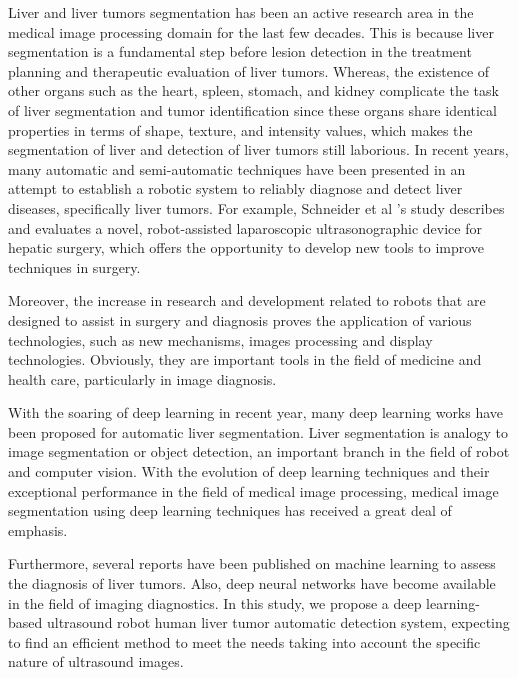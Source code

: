 \documentclass [11pt, twocolumn] {article}
\begin{document}
Liver and liver tumors segmentation has been an active research area in the medical image processing domain for the last few decades. This is because liver segmentation is a fundamental step before lesion detection in the treatment planning and therapeutic evaluation of liver tumors\cite{r3}. Whereas, the existence of other organs such as the heart, spleen, stomach, and kidney complicate the task of liver segmentation and tumor identification since these organs share identical properties in terms of shape, texture, and intensity values, which makes the segmentation of liver and detection of liver tumors still laborious\cite{r4}. In recent years, many automatic and semi-automatic techniques have been presented in an attempt to establish a robotic system to reliably diagnose and detect liver diseases, specifically liver tumors. For example, Schneider et al\cite{r5} 's study describes and evaluates a novel, robot-assisted laparoscopic ultrasonographic device for hepatic surgery, which offers the opportunity to develop new tools to improve techniques in surgery.

Moreover, the increase in research and development related to robots that are designed to assist in surgery and diagnosis proves the application of various technologies, such as new mechanisms, images processing and display technologies. Obviously, they are important tools in the field of medicine and health care, particularly in image diagnosis.

With the soaring of deep learning in recent year, many deep learning works have been proposed for automatic liver segmentation\cite{r6,r7}. Liver segmentation is analogy to image segmentation or object detection, an important branch in the field of robot and computer vision. With the evolution of deep learning techniques and their exceptional performance in the field of medical image processing, medical image segmentation using deep learning techniques has received a great deal of emphasis.

Furthermore, several reports have been published on machine learning to assess the diagnosis of liver tumors. Also, deep neural networks have become available in the field of imaging diagnostics. In this study, we propose a deep learning-based ultrasound robot human liver tumor automatic detection system, expecting to find an efficient method to meet the needs taking into account the specific nature of ultrasound images.
\end{document}
